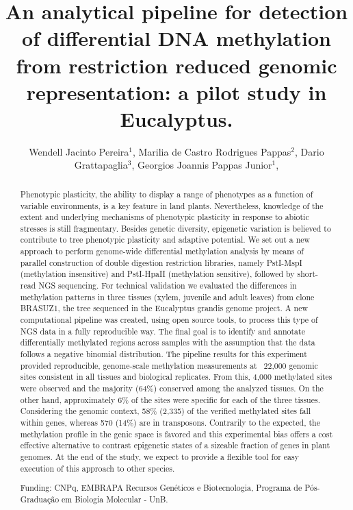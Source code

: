 \documentclass[twoside]{article}
\title{\vspace{-15mm}\fontsize{24pt}{10pt}\selectfont\textbf{ An analytical pipeline for detection of differential DNA methylation from restriction reduced genomic representation: a pilot study in Eucalyptus. }} %
\author{ Wendell Jacinto Pereira$^{1}$, Marilia de Castro Rodrigues Pappas$^{2}$, Dario Grattapaglia$^{3}$, Georgios Joannis Pappas Junior$^{1}$, }
\affil{ 1 Departamento de Biologia Celular, Instituto de Ciências Biológicas, Universidade de Brasília

2 EMBRAPA Recursos Genéticos e Biotecnologia

3 EMBRAPA Recursos Genéticos e Biotecnologia, Universidade Católica de Brasília.

 }
\date{}
\begin{document}
  
  
  \maketitle %
  
  
  \thispagestyle{fancy} %
  
  
  \begin{abstract}
  Phenotypic plasticity, the ability to display a range of phenotypes as a function of variable environments, is a key feature in land plants. Nevertheless, knowledge of the extent and underlying mechanisms of phenotypic plasticity in response to abiotic stresses is still fragmentary. Besides genetic diversity, epigenetic variation is believed to contribute to tree phenotypic plasticity and adaptive potential. We set out a new approach to perform genome-wide differential methylation analysis by means of parallel construction of double digestion restriction libraries, namely PstI-MspI (methylation insensitive) and PstI-HpaII (methylation sensitive), followed by short-read NGS sequencing. For technical validation we evaluated the differences in methylation patterns in three tissues (xylem, juvenile and adult leaves) from clone BRASUZ1, the tree sequenced in the Eucalyptus grandis genome project. A new computational pipeline was created, using open source tools, to process this type of NGS data in a fully reproducible way. The final goal is to identify and annotate differentially methylated regions across samples with the assumption that the data follows a negative binomial distribution. The pipeline results for this experiment provided reproducible, genome-scale methylation measurements at ~22,000 genomic sites consistent in all tissues and biological replicates. From this, 4,000 methylated sites were observed and the majority (64\%) conserved among the analyzed tissues. On the other hand, approximately 6\% of the sites were specific for each of the three tissues. Considering the genomic context, 58\% (2,335) of the verified methylated sites fall within genes, whereas 570 (14\%) are in transposons. Contrarily to the expected, the methylation profile in the genic space is favored and this experimental bias offers a cost effective alternative to contrast epigenetic states of a sizeable fraction of genes in plant genomes. At the end of the study, we expect to provide a flexible tool for easy execution of this approach to other species.
  
  Funding: CNPq, EMBRAPA Recursos Gen\'eticos e Biotecnologia, Programa de P\'os-Gradua\c{c}\~ao em Biologia Molecular - UnB. \\ 
  \end{abstract}
  
\end{document}
